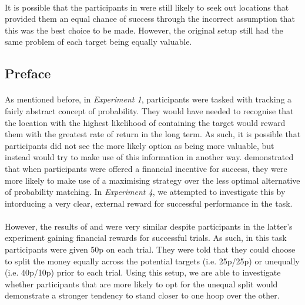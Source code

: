 \documentclass[12pt]{article}
\begin{document}
\paragraph{} It is possible that the participants in \cite{morvan2012human} were still likely to seek out locations that provided them an equal chance of success through the incorrect assumption that this was the best choice to be made. However, the original setup still had the same problem of each target being equally valuable. 


\subsection*{Preface}
\paragraph{} As mentioned before, in \textit{Experiment 1}, participants were tasked with tracking a fairly abstract concept of probability. They would have needed to recognise that the location with the highest likelihood of containing the target would reward them with the greatest rate of return in the long term. As such, it is possible that participants did not see the more likely option as being more valuable, but instead would try to make use of this information in another way. \cite{Goodnow1955} demonstrated that when participants were offered a financial incentive for success, they were more likely to make use of a maximising strategy over the less optimal alternative of probability matching. In \textit{Experiment 4}, we attempted to investigate this by intorducing a very clear, external reward for successful performance in the task. 

\paragraph{} However, the results of \cite{clarke2015failure} and \cite{morvan2012human} were very similar despite participants in the latter's experiment gaining financial rewards for successful trials. As such, in this task participants were given 50p on each trial. They were told that they could choose to split the money equally across the potential targets (i.e. 25p/25p) or unequally (i.e. 40p/10p) prior to each trial. Using this setup, we are able to investigate whether participants that are more likely to opt for the unequal split would demonstrate a stronger tendency to stand closer to one hoop over the other.  
\end{document}
